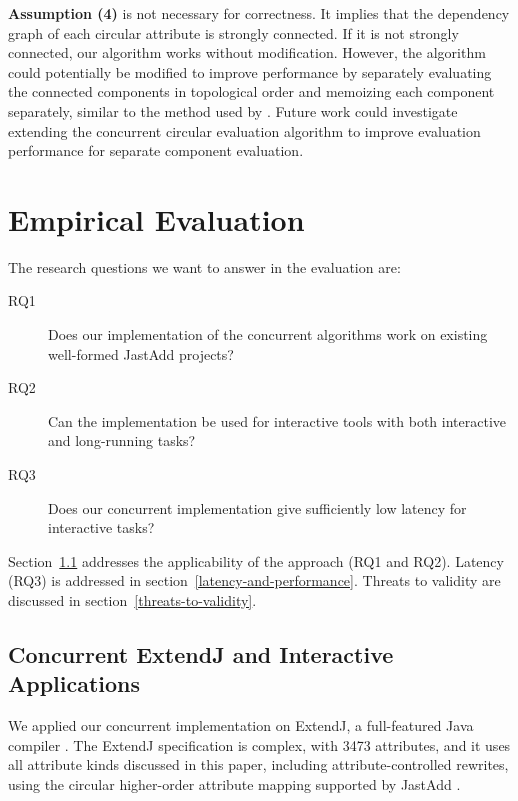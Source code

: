 {\textbf{Assumption (4)} is not necessary for correctness.
It implies that the dependency graph of each circular attribute is strongly
connected. If it is not strongly connected, our algorithm works without modification.
However, the algorithm could potentially
be modified to improve performance by separately evaluating the connected components
in topological order and memoizing each component separately, similar to the method
used by \textcite{DBLP:journals/entcs/MagnussonH03}.
Future work could investigate extending the concurrent circular evaluation algorithm
to improve evaluation performance for separate component evaluation.

\section{Empirical Evaluation}
\label{evaluation}

The research questions we want to answer in the evaluation are:

\begin{description}
  \item[RQ1] Does our implementation of the concurrent algorithms work on existing well-formed
    JastAdd projects?
  \item[RQ2] Can the implementation be used for interactive tools with both interactive and long-running tasks?
  \item[RQ3] Does our concurrent implementation give sufficiently low latency for interactive tasks?
\end{description}


Section~\ref{concurrent-extendj} addresses the applicability of the approach (RQ1 and RQ2).
Latency (RQ3) is addressed in section~\ref{latency-and-performance}.
Threats to validity are discussed in section~\ref{threats-to-validity}.


\subsection{Concurrent ExtendJ and Interactive Applications}
\label{concurrent-extendj}

We applied our concurrent implementation on ExtendJ, a full-featured Java compiler \cite{jastaddj}.
The ExtendJ specification is complex, with 3473 attributes, and it uses all attribute kinds discussed in this
paper, including attribute-controlled rewrites, using the circular higher-order
attribute mapping supported by JastAdd \cite{DBLP:journals/cl/SoderbergH15}.

}
